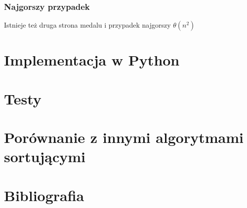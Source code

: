 \documentclass[12pt]{article}
\begin{document}
\subsubsection{Najgorszy przypadek}
Istnieje też druga strona medalu i przypadek najgorszy $\theta(n^2)$
\section{Implementacja w Python}
\section{Testy}
\section{Porównanie z innymi algorytmami sortującymi}
\section{Bibliografia}
\end{document}
